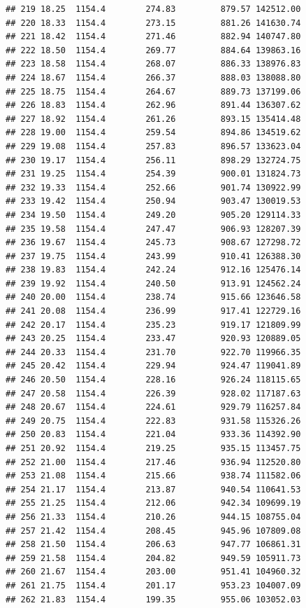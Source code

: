 \documentclass[]{article}
\begin{document}
\begin{verbatim}
## 219 18.25  1154.4        274.83         879.57 142512.00
## 220 18.33  1154.4        273.15         881.26 141630.74
## 221 18.42  1154.4        271.46         882.94 140747.80
## 222 18.50  1154.4        269.77         884.64 139863.16
## 223 18.58  1154.4        268.07         886.33 138976.83
## 224 18.67  1154.4        266.37         888.03 138088.80
## 225 18.75  1154.4        264.67         889.73 137199.06
## 226 18.83  1154.4        262.96         891.44 136307.62
## 227 18.92  1154.4        261.26         893.15 135414.48
## 228 19.00  1154.4        259.54         894.86 134519.62
## 229 19.08  1154.4        257.83         896.57 133623.04
## 230 19.17  1154.4        256.11         898.29 132724.75
## 231 19.25  1154.4        254.39         900.01 131824.73
## 232 19.33  1154.4        252.66         901.74 130922.99
## 233 19.42  1154.4        250.94         903.47 130019.53
## 234 19.50  1154.4        249.20         905.20 129114.33
## 235 19.58  1154.4        247.47         906.93 128207.39
## 236 19.67  1154.4        245.73         908.67 127298.72
## 237 19.75  1154.4        243.99         910.41 126388.30
## 238 19.83  1154.4        242.24         912.16 125476.14
## 239 19.92  1154.4        240.50         913.91 124562.24
## 240 20.00  1154.4        238.74         915.66 123646.58
## 241 20.08  1154.4        236.99         917.41 122729.16
## 242 20.17  1154.4        235.23         919.17 121809.99
## 243 20.25  1154.4        233.47         920.93 120889.05
## 244 20.33  1154.4        231.70         922.70 119966.35
## 245 20.42  1154.4        229.94         924.47 119041.89
## 246 20.50  1154.4        228.16         926.24 118115.65
## 247 20.58  1154.4        226.39         928.02 117187.63
## 248 20.67  1154.4        224.61         929.79 116257.84
## 249 20.75  1154.4        222.83         931.58 115326.26
## 250 20.83  1154.4        221.04         933.36 114392.90
## 251 20.92  1154.4        219.25         935.15 113457.75
## 252 21.00  1154.4        217.46         936.94 112520.80
## 253 21.08  1154.4        215.66         938.74 111582.06
## 254 21.17  1154.4        213.87         940.54 110641.53
## 255 21.25  1154.4        212.06         942.34 109699.19
## 256 21.33  1154.4        210.26         944.15 108755.04
## 257 21.42  1154.4        208.45         945.96 107809.08
## 258 21.50  1154.4        206.63         947.77 106861.31
## 259 21.58  1154.4        204.82         949.59 105911.73
## 260 21.67  1154.4        203.00         951.41 104960.32
## 261 21.75  1154.4        201.17         953.23 104007.09
## 262 21.83  1154.4        199.35         955.06 103052.03

\end{verbatim}
\end{document}
